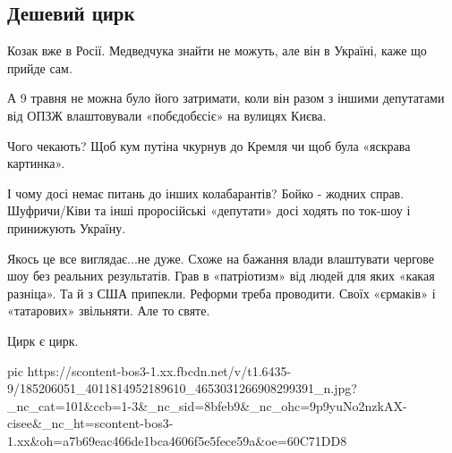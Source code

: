  
 
 
 
 

\subsection{Дешевий цирк}
\label{sec:11_05_2021.fb.smolij_andrij.1.medvedchuk_kozak_rossia_ukraina}

Козак вже в Росії. Медведчука знайти не можуть, але він в Україні, каже що прийде сам.

А 9 травня не можна було його затримати, коли він разом з іншими депутатами від
ОПЗЖ влаштовували «побєдобєсіє» на вулицях Києва. 

Чого чекають? Щоб кум путіна чкурнув до Кремля чи щоб була «яскрава картинка». 

І чому досі немає питань до інших колабарантів? Бойко - жодних справ.
Шуфричи/Ківи та інші проросійські «депутати» досі ходять по ток-шоу і
принижують Україну. 

Якось це все виглядає...не дуже. Схоже на бажання влади влаштувати чергове шоу
без реальних результатів. Грав в «патріотизм» від людей для яких «какая
разніца». Та й з США припекли. Реформи треба проводити. Своїх «єрмаків» і
«татарових» звільняти. Але то святе. 

Цирк є цирк.

\ifcmt
  pic https://scontent-bos3-1.xx.fbcdn.net/v/t1.6435-9/185206051_4011814952189610_4653031266908299391_n.jpg?_nc_cat=101&ccb=1-3&_nc_sid=8bfeb9&_nc_ohc=9p9yuNo2nzkAX-cisee&_nc_ht=scontent-bos3-1.xx&oh=a7b69eac466de1bca4606f5e5fece59a&oe=60C71DD8
\fi
